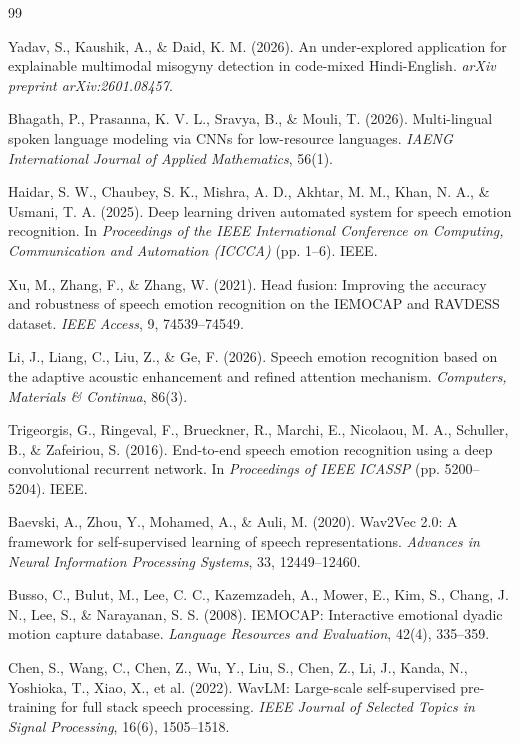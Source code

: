 \documentclass[runningheads]{llncs}
\begin{document}
\begin{thebibliography}{99}

Yadav, S., Kaushik, A., \& Daid, K. M. (2026).
An under-explored application for explainable multimodal misogyny detection in code-mixed Hindi-English.
\textit{arXiv preprint arXiv:2601.08457}.

Bhagath, P., Prasanna, K. V. L., Sravya, B., \& Mouli, T. (2026).
Multi-lingual spoken language modeling via CNNs for low-resource languages.
\textit{IAENG International Journal of Applied Mathematics}, 56(1).

Haidar, S. W., Chaubey, S. K., Mishra, A. D., Akhtar, M. M., Khan, N. A., \& Usmani, T. A. (2025).
Deep learning driven automated system for speech emotion recognition.
In \textit{Proceedings of the IEEE International Conference on Computing, Communication and Automation (ICCCA)} (pp. 1--6). IEEE.

Xu, M., Zhang, F., \& Zhang, W. (2021).
Head fusion: Improving the accuracy and robustness of speech emotion recognition on the IEMOCAP and RAVDESS dataset.
\textit{IEEE Access}, 9, 74539--74549.

Li, J., Liang, C., Liu, Z., \& Ge, F. (2026).
Speech emotion recognition based on the adaptive acoustic enhancement and refined attention mechanism.
\textit{Computers, Materials \& Continua}, 86(3).

Trigeorgis, G., Ringeval, F., Brueckner, R., Marchi, E., Nicolaou, M. A., Schuller, B., \& Zafeiriou, S. (2016).
End-to-end speech emotion recognition using a deep convolutional recurrent network.
In \textit{Proceedings of IEEE ICASSP} (pp. 5200--5204). IEEE.

Baevski, A., Zhou, Y., Mohamed, A., \& Auli, M. (2020).
Wav2Vec 2.0: A framework for self-supervised learning of speech representations.
\textit{Advances in Neural Information Processing Systems}, 33, 12449--12460.

Busso, C., Bulut, M., Lee, C. C., Kazemzadeh, A., Mower, E., Kim, S., Chang, J. N., Lee, S., \& Narayanan, S. S. (2008).
IEMOCAP: Interactive emotional dyadic motion capture database.
\textit{Language Resources and Evaluation}, 42(4), 335--359.

Chen, S., Wang, C., Chen, Z., Wu, Y., Liu, S., Chen, Z., Li, J., Kanda, N., Yoshioka, T., Xiao, X., et al. (2022).
WavLM: Large-scale self-supervised pre-training for full stack speech processing.
\textit{IEEE Journal of Selected Topics in Signal Processing}, 16(6), 1505--1518.


\end{thebibliography}
\end{document}
